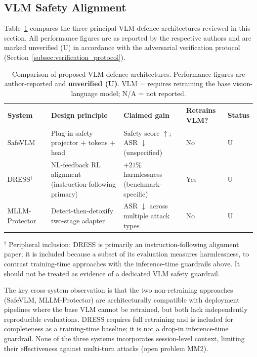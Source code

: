 \subsection{VLM Safety Alignment}

Table~\ref{tab:vlm_defence} compares the three principal VLM defence architectures
reviewed in this section.
All performance figures are as reported by the respective authors and are marked
unverified (U) in accordance with the adversarial verification protocol
(Section~\ref{subsec:verification_protocol}).

\begin{table}[t]
  \caption{Comparison of proposed VLM defence architectures. Performance figures
           are author-reported and \textbf{unverified (U)}. VLM = requires retraining
           the base vision-language model; N/A = not reported.}
  \label{tab:vlm_defence}
  \centering
  \begin{tabular}{p{2.5cm}p{3.0cm}p{2.5cm}p{2.5cm}p{1.5cm}}
    \toprule
    \textbf{System} & \textbf{Design principle} & \textbf{Claimed gain} & \textbf{Retrains VLM?} & \textbf{Status} \\
    \midrule
    SafeVLM~\cite{oh2024safevlm}
      & Plug-in safety projector + tokens + head
      & Safety score $\uparrow$; ASR $\downarrow$ (unspecified)
      & No
      & U \\
    DRESS$^\dagger$~\cite{chen2024dresssafety}
      & NL-feedback RL alignment (instruction-following primary)
      & $+21\%$ harmlessness (benchmark-specific)
      & Yes
      & U \\
    MLLM-Protector~\cite{pi2024mllm}
      & Detect-then-detoxify two-stage adapter
      & ASR $\downarrow$ across multiple attack types
      & No
      & U \\
    \bottomrule
  \end{tabular}
  \par\smallskip
  \noindent\small $^\dagger$ Peripheral inclusion: DRESS is primarily an
  instruction-following alignment paper; it is included because a subset of its
  evaluation measures harmlessness, to contrast training-time approaches with the
  inference-time guardrails above.
  It should not be treated as evidence of a dedicated VLM safety guardrail.
\end{table}

The key cross-system observation is that the two non-retraining approaches
(SafeVLM, MLLM-Protector) are architecturally compatible with deployment pipelines
where the base VLM cannot be retrained, but both lack independently reproducible
evaluations.
DRESS requires full retraining and is included for completeness as a training-time
baseline; it is not a drop-in inference-time guardrail.
None of the three systems incorporates session-level context, limiting their
effectiveness against multi-turn attacks (open problem MM2).


